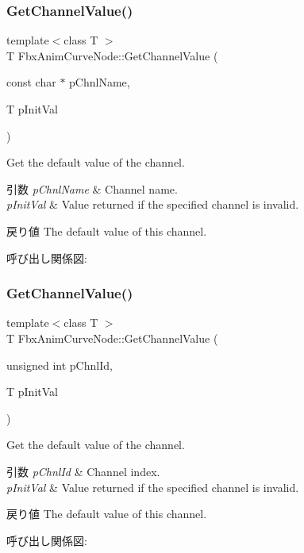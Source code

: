 \subsubsection{\texorpdfstring{Get\+Channel\+Value()}{GetChannelValue()}\hspace{0.1cm}{\footnotesize\ttfamily [1/2]}}
{\footnotesize\ttfamily template$<$class T $>$ \\
T Fbx\+Anim\+Curve\+Node\+::\+Get\+Channel\+Value (\begin{DoxyParamCaption}\item[{const char $\ast$}]{p\+Chnl\+Name,  }\item[{T}]{p\+Init\+Val }\end{DoxyParamCaption})}

Get the default value of the channel. 
\begin{DoxyParams}{引数}
{\em p\+Chnl\+Name} & Channel name. \\
\hline
{\em p\+Init\+Val} & Value returned if the specified channel is invalid. \\
\hline
\end{DoxyParams}
\begin{DoxyReturn}{戻り値}
The default value of this channel. 
\end{DoxyReturn}
呼び出し関係図\+:
\mbox{\label{class_fbx_anim_curve_node_a1fb96d04b8c53ec130c5be376b923c6c}} 
\subsubsection{\texorpdfstring{Get\+Channel\+Value()}{GetChannelValue()}\hspace{0.1cm}{\footnotesize\ttfamily [2/2]}}
{\footnotesize\ttfamily template$<$class T $>$ \\
T Fbx\+Anim\+Curve\+Node\+::\+Get\+Channel\+Value (\begin{DoxyParamCaption}\item[{unsigned int}]{p\+Chnl\+Id,  }\item[{T}]{p\+Init\+Val }\end{DoxyParamCaption})}

Get the default value of the channel. 
\begin{DoxyParams}{引数}
{\em p\+Chnl\+Id} & Channel index. \\
\hline
{\em p\+Init\+Val} & Value returned if the specified channel is invalid. \\
\hline
\end{DoxyParams}
\begin{DoxyReturn}{戻り値}
The default value of this channel. 
\end{DoxyReturn}
呼び出し関係図\+:
\mbox{\label{class_fbx_anim_curve_node_a818b6198c31818e863d3d5bc7948c2e2}} 
